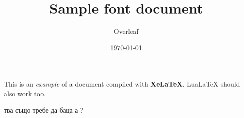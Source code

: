 \documentclass[12pt]{article}
\title{Sample font document}
\author{Overleaf}
\date{\today}
\begin{document}
\maketitle

This is an \textit{example} of a document compiled
with \textbf{XeLaTeX}. LuaLaTeX should also work too.

тва също требе да баца а ?
\end{document}
